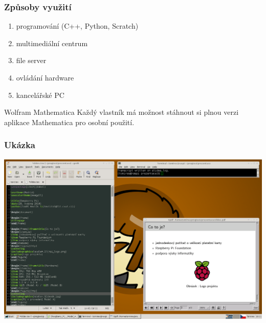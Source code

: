 \documentclass{beamer}
\begin{document}
\begin{frame}\frametitle{Způsoby využití}
\begin{enumerate}
\item programování (C++, Python, Scratch)
\item multimediální centrum
\item file server
\item ovládání hardware
\item kancelářské PC
\end{enumerate}
\begin{alertblock}{Wolfram Mathematica}
Každý vlastník má možnost stáhnout si plnou verzi aplikace Mathematica pro osobní použití.
\end{alertblock}
\end{frame}

\begin{frame}\frametitle{Ukázka}
\centering
\includegraphics[keepaspectratio=true,width=0.95\paperwidth]{screen.png}
\end{frame}
\end{document}
